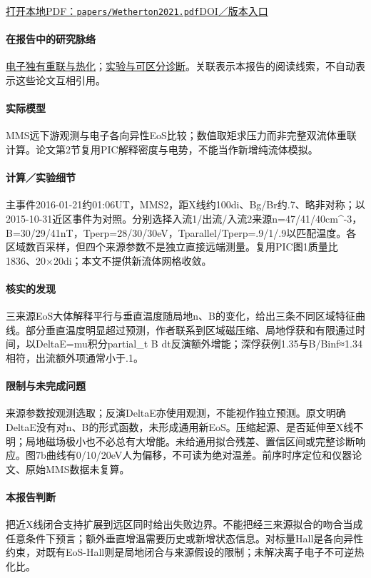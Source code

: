 \documentclass[UTF8,a4paper,11pt,openany,fontset=fandol]{ctexbook}
\begin{document}
\href{run:../papers/Wetherton2021.pdf}{打开本地PDF：\texttt{papers/Wetherton2021.pdf}}\quad\href{https://doi.org/10.1029/2020JA028604}{DOI／版本入口}

\paragraph{在报告中的研究脉络}\hyperref[story:energy]{电子独有重联与热化}；\hyperref[story:diagnostic]{实验与可区分诊断}。关联表示本报告的阅读线索，不自动表示这些论文互相引用。

\paragraph{实际模型}MMS远下游观测与电子各向异性EoS比较；数值取矩求压力而非完整双流体重联计算。论文第2节复用PIC解释密度与电势，不能当作新增纯流体模拟。

\paragraph{计算／实验细节}主事件2016-01-21约01:06UT，MMS2，距X线约100di、Bg/Br约.7、略非对称；以2015-10-31近区事件为对照。分别选择入流1/出流/入流2来源n=47/41/40cm\textasciicircum{}-3，B=30/29/41nT，Tperp=28/30/30eV，Tparallel/Tperp=.9/1/.9以匹配温度。各区域数百采样，但四个来源参数不是独立直接远端测量。复用PIC图1质量比1836、20×20di；本文不提供新流体网格收敛。

\paragraph{核实的发现}三来源EoS大体解释平行与垂直温度随局地n、B的变化，给出三条不同区域特征曲线。部分垂直温度明显超过预测，作者联系到区域磁压缩、局地俘获和有限通过时间，以DeltaE=mu积分partial\_t B dt反演额外增能；深俘获例1.35与B/Binf≈1.34相符，出流额外项通常小于.1。

\paragraph{限制与未完成问题}来源参数按观测选取；反演DeltaE亦使用观测，不能视作独立预测。原文明确DeltaE没有对n、B的形式函数，未形成通用新EoS。压缩起源、是否延伸至X线不明；局地磁场极小也不必总有大增能。未给通用拟合残差、置信区间或完整诊断响应。图7b曲线有0/10/20eV人为偏移，不可读为绝对温差。前序时序定位和仪器论文、原始MMS数据未复算。

\paragraph{本报告判断}把近X线闭合支持扩展到远区同时给出失败边界。不能把经三来源拟合的吻合当成任意条件下预言；额外垂直增温需要历史或新增状态信息。对标量Hall是各向异性约束，对既有EoS-Hall则是局地闭合与来源假设的限制；未解决离子电子不可逆热化比。
\end{document}
